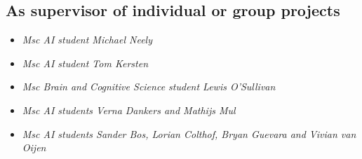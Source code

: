 {{{{{{{{\vspace{1mm}

\subsection{As supervisor of individual or group projects}

{
{\begin{itemize}
  \item[] \textit{Msc AI student Michael Neely}
\end{itemize}}}

{
{\begin{itemize}
  \item[] \textit{Msc AI student Tom Kersten}
\end{itemize}}}


{
{\begin{itemize}
  \item[] \textit{Msc Brain and Cognitive Science student Lewis O'Sullivan}
\end{itemize}}}

{
{\begin{itemize}
  \item[] \textit{Msc AI students Verna Dankers and Mathijs Mul}
\end{itemize}}}

{
{\begin{itemize}
  \item[] \textit{Msc AI students Sander Bos, Lorian Colthof, Bryan Guevara and Vivian van Oijen}
\end{itemize}}}

}}}}}}}}
